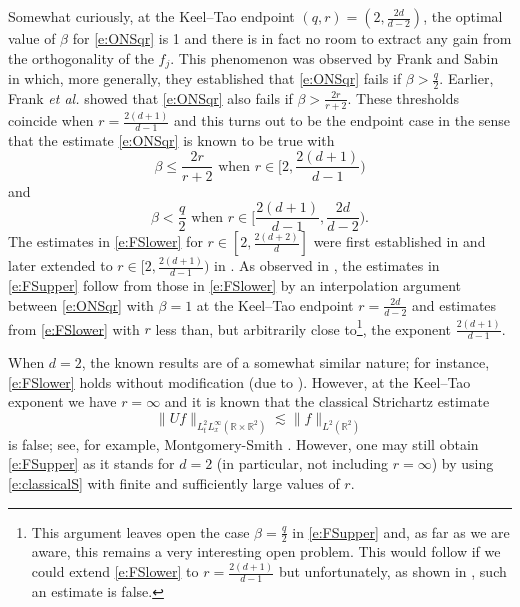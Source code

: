 \documentclass[a4paper]{amsart}
\numberwithin{equation}{section}%
\theoremstyle{plain}%
\theoremstyle{definition}
\theoremstyle{remark}%
\begin{document}
Somewhat curiously, at the Keel--Tao endpoint $(q,r) = (2,\frac{2d}{d-2})$, the optimal value of $\beta$ for \eqref{e:ONSqr} is 1 and there is in fact no room to extract any gain from the orthogonality of the $f_j$. This phenomenon was observed by Frank and Sabin \cite{FS_Survey} in which, more generally, they established  that \eqref{e:ONSqr} fails if $\beta > \frac{q}{2}$. Earlier, Frank \emph{et al.} \cite{FLLS} showed that \eqref{e:ONSqr} also fails if $\beta > \frac{2r}{r + 2}$. These thresholds coincide when $r = \frac{2(d + 1)}{d-1}$ and this turns out to be the endpoint case in the sense that the estimate \eqref{e:ONSqr} is known to be true with
\begin{equation} \label{e:FSlower}
\text{$\beta \leq \frac{2r}{r + 2}$ when $r \in \bigg[2,\frac{2(d + 1)}{d-1}\bigg)$}
\end{equation}
and
\begin{equation} \label{e:FSupper}
\text{$\beta < \frac{q}{2}$ when $r \in \bigg[\frac{2(d + 1)}{d-1},\frac{2d}{d-2}\bigg)$.}
\end{equation}
The estimates in \eqref{e:FSlower} for $r \in [2,\frac{2(d + 2)}{d}]$ were first established in \cite{FLLS} and later extended to $r \in [2,\frac{2(d + 1)}{d-1})$ in \cite{FS_AJM}. As observed in \cite{FS_Survey}, the estimates in \eqref{e:FSupper} follow from those in \eqref{e:FSlower} by an interpolation argument between \eqref{e:ONSqr} with $\beta = 1$ at the Keel--Tao endpoint $r = \frac{2d}{d-2}$ and estimates from \eqref{e:FSlower} with $r$ less than, but arbitrarily close to\footnote{This argument leaves open the case $\beta = \frac{q}{2}$ in \eqref{e:FSupper} and, as far as we are aware, this remains a very interesting open problem. This would follow if we could extend \eqref{e:FSlower} to $r = \frac{2(d+1)}{d-1}$ but unfortunately, as shown in \cite{FLLS}, such an estimate is false.}, the exponent $\frac{2(d+1)}{d-1}$.

When $d = 2$, the known results are of a somewhat similar nature; for instance, \eqref{e:FSlower} holds without modification (due to \cite{FLLS, FS_AJM}). However, at the Keel--Tao exponent we have $r = \infty$ and it is known that the classical Strichartz estimate
\begin{equation} \label{e:classicalSfalsed=2}
\| Uf \|_{L^2_tL^\infty_x(\mathbb{R} \times \mathbb{R}^2)} \lesssim \|f\|_{L^2(\mathbb{R}^2)}
\end{equation}
is false; see, for example, Montgomery-Smith \cite{MontSmith}. However, one may still obtain \eqref{e:FSupper} as it stands for $d = 2$ (in particular, not including $r = \infty$) by using \eqref{e:classicalS} with finite and sufficiently large values of $r$.
\end{document}
